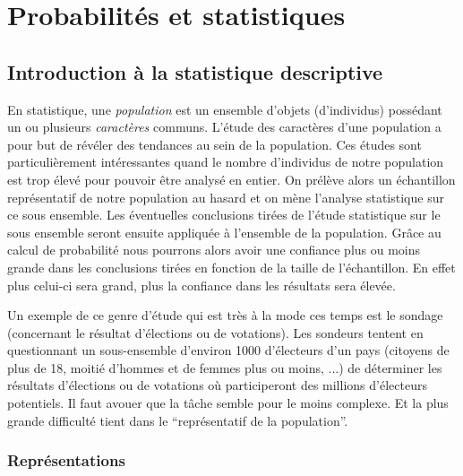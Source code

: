\documentclass[a4paper,12pt]{book}
\begin{document}
\chapter{Probabilités et statistiques}

\section{Introduction à la statistique descriptive}

En statistique, une \textit{population} est un ensemble d'objets (d'individus) possédant un ou plusieurs \textit{caractères} communs.
L'étude des caractères d'une population a pour but de révéler des tendances au sein de la population. Ces études sont particulièrement
intéressantes quand le nombre d'individus de notre population est trop élevé pour pouvoir être analysé en entier. On prélève alors un échantillon 
représentatif de notre population au hasard 
et on mène l'analyse statistique sur ce sous ensemble. Les éventuelles conclusions tirées de l'étude statistique sur le sous ensemble seront ensuite appliquée
à l'ensemble de la population. Grâce au calcul de probabilité nous pourrons alors avoir une confiance plus ou moins grande dans les conclusions 
tirées en fonction de la taille de l'échantillon. En effet plus celui-ci sera grand, plus la confiance dans les résultats sera élevée.

Un exemple de ce genre d'étude qui est très à la mode ces temps est le sondage (concernant le résultat d'élections ou de votations). 
Les sondeurs tentent en questionnant un sous-ensemble 
d'environ 1000 d'électeurs d'un pays (citoyens de plus de 18, moitié d'hommes et de femmes plus ou moins, ...) de déterminer 
les résultats d'élections ou de votations où participeront des millions d'électeurs potentiels. Il faut avouer que la tâche semble pour 
le moins complexe. Et la plus grande difficulté tient dans le ``représentatif de la population''.

\subsection{Représentations}
\end{document}
